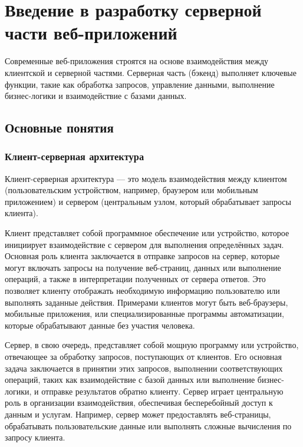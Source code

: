 \section{Введение в разработку серверной части веб-приложений}

Современные веб-приложения строятся на основе взаимодействия между клиентской и серверной частями. Серверная часть (бэкенд) выполняет ключевые функции, такие как обработка запросов, управление данными, выполнение бизнес-логики и взаимодействие с базами данных.

\subsection*{Основные понятия}

\subsubsection*{Клиент-серверная архитектура}

Клиент-серверная архитектура — это модель взаимодействия между клиентом (пользовательским устройством, например, браузером или мобильным приложением) и сервером (центральным узлом, который обрабатывает запросы клиента).

Клиент представляет собой программное обеспечение или устройство, которое инициирует взаимодействие с сервером для выполнения определённых задач. Основная роль клиента заключается в отправке запросов на сервер, которые могут включать запросы на получение веб-страниц, данных или выполнение операций, а также в интерпретации полученных от сервера ответов. Это позволяет клиенту отображать необходимую информацию пользователю или выполнять заданные действия. Примерами клиентов могут быть веб-браузеры, мобильные приложения, или специализированные программы автоматизации, которые обрабатывают данные без участия человека.

Сервер, в свою очередь, представляет собой мощную программу или устройство, отвечающее за обработку запросов, поступающих от клиентов. Его основная задача заключается в принятии этих запросов, выполнении соответствующих операций, таких как взаимодействие с базой данных или выполнение бизнес-логики, и отправке результатов обратно клиенту. Сервер играет центральную роль в организации взаимодействия, обеспечивая бесперебойный доступ к данным и услугам. Например, сервер может предоставлять веб-страницы, обрабатывать пользовательские данные или выполнять сложные вычисления по запросу клиента.

